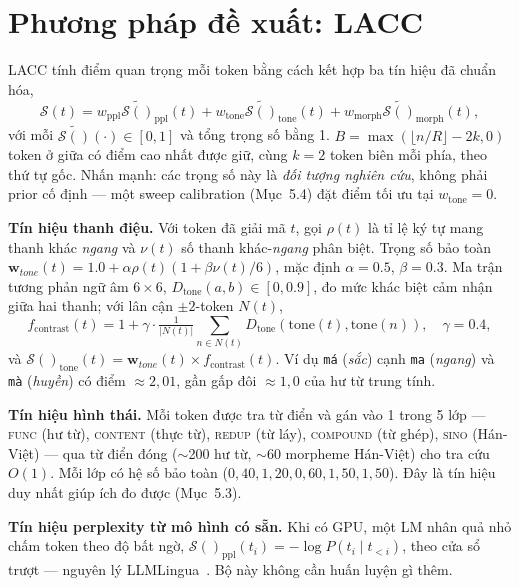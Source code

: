 \documentclass[runningheads]{llncs}
\newcommand{\tone}[1]{\textit{#1}}
\newcommand{\score}[1]{\mathcal{S}(#1)}
\newcommand{\weight}[1]{\mathbf{w}_{#1}}
\newcommand{\token}[1]{\texttt{#1}}
\newcommand{\method}[1]{\textsc{#1}}
\begin{document}
\section{Phương pháp đề xuất: LACC}

\method{LACC} tính điểm quan trọng mỗi token bằng cách kết hợp ba tín hiệu đã chuẩn hóa,
\begin{equation}
\score{t} = w_{\text{ppl}} \tilde{\score{}}_{\text{ppl}}(t) + w_{\text{tone}} \tilde{\score{}}_{\text{tone}}(t) + w_{\text{morph}} \tilde{\score{}}_{\text{morph}}(t),
\label{eq:combined}
\end{equation}
với mỗi $\tilde{\score{}}(\cdot)\!\in\![0,1]$ và tổng trọng số bằng 1. $B=\max(\lfloor n/R\rfloor-2k,0)$ token ở giữa có điểm cao nhất được giữ, cùng $k{=}2$ token biên mỗi phía, theo thứ tự gốc. Nhấn mạnh: các trọng số này là \emph{đối tượng nghiên cứu}, không phải prior cố định --- một sweep calibration (Mục~5.4) đặt điểm tối ưu tại $w_{\text{tone}}{=}0$.

\textbf{Tín hiệu thanh điệu.} Với token đã giải mã $t$, gọi $\rho(t)$ là tỉ lệ ký tự mang thanh khác \tone{ngang} và $\nu(t)$ số thanh khác-\tone{ngang} phân biệt. Trọng số bảo toàn $\weight{tone}(t) = 1.0+\alpha\rho(t)(1+\beta\nu(t)/6)$, mặc định $\alpha{=}0.5$, $\beta{=}0.3$. Ma trận tương phản ngữ âm $6\times6$, $D_{\text{tone}}(a,b)\in[0,0.9]$, đo mức khác biệt cảm nhận giữa hai thanh; với lân cận $\pm2$-token $N(t)$,
\begin{equation}
f_{\text{contrast}}(t) = 1+\gamma\cdot\tfrac{1}{|N(t)|}\textstyle\sum_{n\in N(t)} D_{\text{tone}}(\text{tone}(t),\text{tone}(n)), \quad \gamma{=}0.4,
\end{equation}
và $\score{}_{\text{tone}}(t)=\weight{tone}(t)\times f_{\text{contrast}}(t)$. Ví dụ \token{má} (\tone{sắc}) cạnh \token{ma} (\tone{ngang}) và \token{mà} (\tone{huyền}) có điểm $\approx2{,}01$, gần gấp đôi $\approx1{,}0$ của hư từ trung tính.

\textbf{Tín hiệu hình thái.} Mỗi token được tra từ điển và gán vào 1 trong 5 lớp --- \textsc{func} (hư từ), \textsc{content} (thực từ), \textsc{redup} (từ láy), \textsc{compound} (từ ghép), \textsc{sino} (Hán-Việt) --- qua từ điển đóng ($\sim$200 hư từ, $\sim$60 morpheme Hán-Việt) cho tra cứu $O(1)$. Mỗi lớp có hệ số bảo toàn ($0{,}40, 1{,}20, 0{,}60, 1{,}50, 1{,}50$). Đây là tín hiệu duy nhất giúp ích đo được (Mục~5.3).

\textbf{Tín hiệu perplexity từ mô hình có sẵn.} Khi có GPU, một LM nhân quả nhỏ chấm token theo độ bất ngờ, $\score{}_{\text{ppl}}(t_i)=-\log P(t_i\mid t_{<i})$, theo cửa sổ trượt --- nguyên lý LLMLingua~\cite{jiang2023llmlingua}. Bộ này không cần huấn luyện gì thêm.
\end{document}
